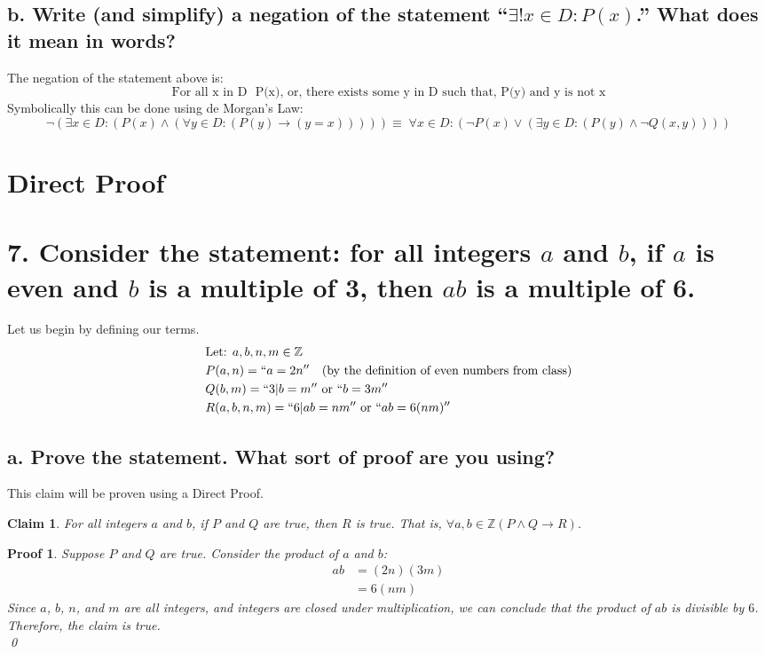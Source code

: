 \documentclass{article}
\newtheorem*{claim}{Claim}
\newtheorem*{poof}{Proof}
\begin{document}
\subsection*{b. Write (and simplify) a negation of the statement ``$\exists ! x \in D:P(x)$.'' What does it mean in words?}

The negation of the statement above is:
\[\text{For all x in D ~P(x), or, there exists some y in D such that, P(y) and y is not x}\]
Symbolically this can be done using de Morgan's Law:
\[\neg (\exists x \in D : (P(x) \wedge (\forall y \in D : (P(y) \rightarrow (y = x))))) \equiv \; \forall x \in D : (\neg P(x) \vee (\exists y \in D : (P(y) \wedge \neg Q(x,y))))\]
\newpage
\section*{Direct Proof}
\section*{7. Consider the statement: for all integers $a$ and $b$, if $a$ is even and $b$ is a multiple of 3, then $ab$ is a multiple of 6.}
Let us begin by defining our terms.
\begin{align*}
    &\text{Let: } a,b,n,m\in\mathbb{Z} \\
    &P(a,n) = ``a = 2n'' \quad \text{(by the definition of even numbers from class)} \\
    &Q(b,m) = ``3|b=m'' \text{ or } ``b=3m'' \\
    &R(a,b,n,m)= ``6|ab=nm'' \text{ or } ``ab = 6(nm)''
\end{align*}
\subsection*{a. Prove the statement. What sort of proof are you using?}
This claim will be proven using a Direct Proof.
\begin{claim}
For all integers $a$ and $b$, if $P$ and $Q$ are true, then $R$ is true. That is, $\forall a, b \in \mathbb{Z} (P \wedge Q \rightarrow R)$.
\end{claim}

\begin{poof}
Suppose $P$ and $Q$ are true. Consider the product of $a$ and $b$:
\begin{align*}
    ab &= (2n)(3m) \\
       &= 6(nm)
\end{align*}
Since $a$, $b$, $n$, and $m$ are all integers, and integers are closed under multiplication, we can conclude that the product of $ab$ is divisible by $6$. Therefore, the claim is true. \\
\qed\end{poof}
\end{document}
